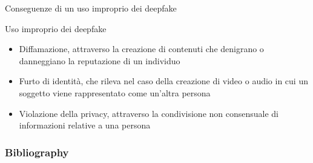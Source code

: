 \documentclass[11pt]{beamer}
\begin{document}
\begin{frame}{Conseguenze di un uso improprio dei deepfake \cite{deepfake_jus}}
\begin{alertblock}{Uso improprio dei deepfake}
\begin{itemize}
\item Diffamazione, attraverso la creazione di contenuti che denigrano o danneggiano la reputazione di un individuo
\item Furto di identità, che rileva nel caso della creazione di video o audio in cui un soggetto viene rappresentato come un’altra persona
\item Violazione della privacy, attraverso la condivisione non consensuale di informazioni relative a una persona
\end{itemize}
\end{alertblock}
\end{frame}










\begin{frame}[t,allowframebreaks]
\frametitle{Bibliography}
\printbibliography
\end{frame}
\end{document}
